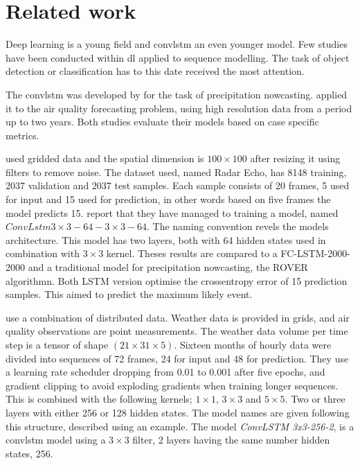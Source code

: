 \section{Related work} \label{sec:related_work}
Deep learning is a young field and \acrshort{convlstm} an even younger model. Few studies have been conducted within \acrshort{dl} applied to sequence modelling. The task of object detection or classification has to this date received the most attention.

The \acrshort{convlstm} was developed by  for the task of precipitation nowcasting.  applied it to the air quality forecasting problem, using high resolution data from a period up to two years. Both studies evaluate their models based on case specific metrics. %

 used gridded data and the spatial dimension is $100\times 100$ after resizing it using filters to remove noise. The dataset used, named Radar Echo, has 8148 training, 2037 validation and 2037 test samples. Each sample consists of 20 frames, 5 used for input and 15 used for prediction, in other words based on five frames the model predicts 15. \citeauthor{precip_nowcasting} report that they have managed to training a model, named $ConvLstm 3\times 3-64-3\times 3-64$. The naming convention revels the models architecture. This model has two layers, both with 64 hidden states used in combination with $3\times 3$ kernel. 
Theses results are compared to a FC-LSTM-2000-2000 and a traditional model for precipitation nowcasting, the ROVER algorithmn. Both LSTM version optimise the crossentropy error of 15 prediction samples. This aimed to predict the maximum likely event. 

 use a combination of distributed data. Weather data is provided in grids, and air quality observations are point measurements. The weather data volume per time step is a tensor of shape $(21 \times 31 \times 5)$. Sixteen months of hourly data were divided into sequences of 72 frames, 24 for input and 48 for prediction. %
They use a learning rate scheduler dropping from 0.01 to 0.001 after five epochs, and gradient clipping to avoid exploding gradients when training longer sequences. This is combined with the following kernels; $1\times 1$, $3\times 3$ and $5\times 5$. Two or three layers with either 256 or 128 hidden states. The model names are given following this structure, described using an example. The model \textit{ConvLSTM 3x3-256-2}, is a \acrshort{convlstm} model using a $3\times 3$ filter, 2 layers having the same number hidden states, 256.

